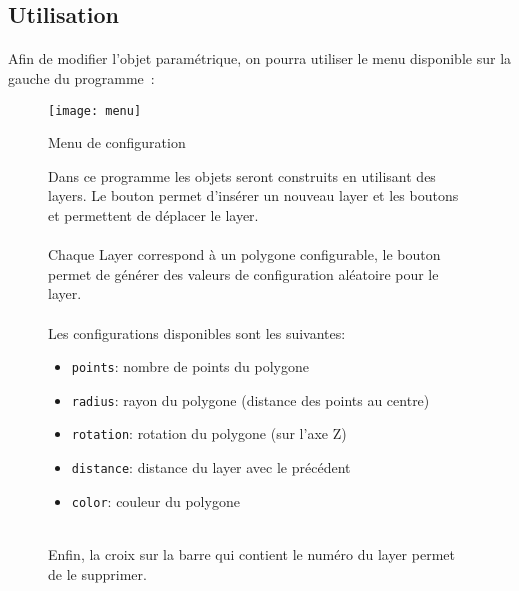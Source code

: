 \documentclass[article, backcover, french, nodocumentinfo]{upmethodology-document}
\begin{document}
		\subsection{Utilisation}
			\paragraph*{}
				Afin de modifier l'objet paramétrique, on pourra utiliser le menu disponible sur la gauche du programme~: \\
				\begin{minipage}[c]{0.4\textwidth}
					\begin{figure}[H]
						\centering%
						\texttt{[image: menu]}%
						\caption{Menu de configuration}%
						\label{fig:menu}%
					\end{figure}
				\end{minipage}
				\begin{minipage}[c]{0.59\textwidth}
					\begin{figure}[H]
						Dans ce programme les objets seront construits en utilisant des layers. Le bouton \fbox{\texttt{+}} permet d'insérer un nouveau layer et les boutons \fbox{$\blacktriangle$} et \fbox{$\blacktriangledown$} permettent de déplacer le layer.\\
						\hfill \\
						Chaque Layer correspond à un polygone configurable, le bouton  permet de générer des valeurs de configuration aléatoire pour le layer.\\
						\hfill \\
						Les configurations disponibles sont les suivantes:
						\begin{itemize}
							\item \texttt{points}: nombre de points du polygone
							\item \texttt{radius}: rayon du polygone (distance des points au centre)
							\item \texttt{rotation}: rotation du polygone (sur l'axe Z)
							\item \texttt{distance}: distance du layer avec le précédent
							\item \texttt{color}: couleur du polygone
						\end{itemize}
						\hfill \\
						Enfin, la croix sur la barre qui contient le numéro du layer permet de le supprimer.
					\end{figure}
				\end{minipage}
\end{document}
